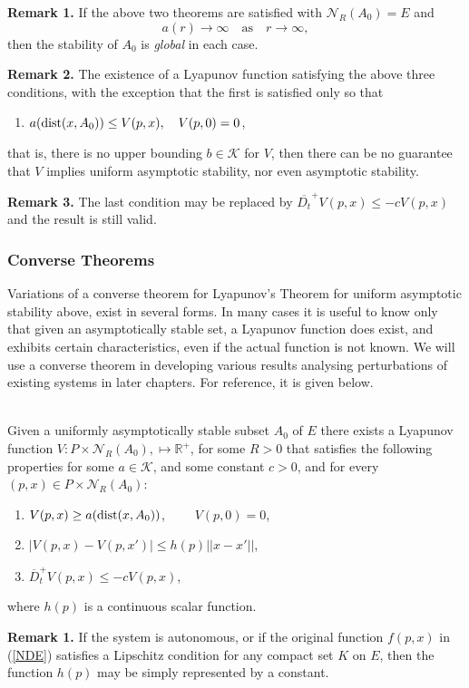 {\bf Remark 1.} If the above two theorems are satisfied with
$\mathcal{N}_R(A_0) = E$ and
\[ a(r) \to \infty \quad \text{as} \quad r \to \infty, \]
then the stability of $A_0$ is {\em global} in each case.

{\bf Remark 2.} The existence of a Lyapunov function satisfying
the above three conditions, with the exception that the first is satisfied
only so that
\begin{enumerate}
  \item $a({\rm dist}(x,A_0)) \leq V(p,x), \quad V(p,0) = 0$,
\end{enumerate}
that is, there is no upper bounding $b \in \mathcal{K}$ for $V$, then there
can be no guarantee that $V$ implies uniform asymptotic stability, nor even
asymptotic stability.

{\bf Remark 3.} The last condition may be replaced by
$\overline{D_t}^{+} V(p,x) \leq -c V(p,x)$ and the result is still valid.

\subsubsection{Converse Theorems}

Variations of a converse theorem for Lyapunov's Theorem for
uniform asymptotic stability above, exist in several forms. In
many cases it is useful to know only that given an asymptotically
stable set, a Lyapunov function does exist, and exhibits certain
characteristics, even if the actual function is not known. We will
use a converse theorem in developing various results analysing
perturbations of existing systems in later chapters. For
reference, it is given below.

\begin{therm}
  \label{LUASCtherm} \hfill \\
  Given a uniformly asymptotically stable subset $A_0$ of $E$
  there exists a Lyapunov function $V:P \times
  \mathcal{N}_R(A_0), \mapsto \mathbb{R}^+$, for some $R>0$ that satisfies
  the following properties for some $a \in \mathcal{K}$, and some
  constant $c > 0$, and for every $(p,x) \in P \times
  \mathcal{N}_R(A_0)$:
\begin{enumerate}
    \item $V(p,x) \geq a({\rm dist}(x,A_0))$, $\qquad V(p,0)=0$,
    \item $|V(p,x)- V(p,x')| \leq h(p) ||x-x'||$,
    \item $\overline{D}^{+}_t V(p,x) \leq -c V(p,x)$,
  \end{enumerate}
  where $h(p)$ is a continuous scalar function.
\end{therm}

{\bf Remark 1.} If the system is autonomous, or if the original
function $f(p,x)$ in (\ref{NDE}) satisfies a Lipschitz condition for
any compact set $K$ on $E$, then the function $h(p)$ may be simply
represented by a constant.

\endinput
